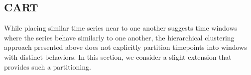 \documentclass{article}
\begin{document}
\begin{figure}[ht]
  \centering
  \caption{\label{fig:centroid-euclidean-presence} }
\end{figure}

\begin{figure}[ht]
  \centering
  \caption{\label{fig:centroid-innovations-conditional}}
\end{figure}

\begin{figure}[ht]
  \centering
  \caption{\label{fig:centroid-innovations-presence}}
\end{figure}

\begin{figure}[ht]
  \centering
  \caption{\label{fig:centroid-jaccard-conditional}}
\end{figure}

\begin{figure}[ht]
  \centering
  \caption{\label{fig:centroid-jaccard-presence}}
\end{figure}

\begin{figure}[ht]
  \centering
  \caption{\label{fig:centroid-mix-conditional}}
\end{figure}

\begin{figure}[ht]
  \centering
  \caption{\label{fig:centroid-mix-presence}}
\end{figure}

\subsection{CART}

While placing similar time series near to one another suggests time windows
where the series behave similarly to one another, the hierarchical clustering
approach presented above does not explicitly partition timepoints into windows
with distinct behaviors. In this section, we consider a slight extension that
provides such a partitioning.
\end{document}
